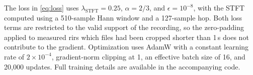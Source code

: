 \documentclass{article}
\begin{document}
The loss in \eqref{eq:loss} uses $\lambda_{\mathrm{STFT}}=0.25$, $\alpha=2/3$, and $\epsilon=10^{-8}$, with the STFT computed using a 510-sample Hann window and a 127-sample hop.
 Both loss terms are restricted to the valid support of the recording, so the zero-padding applied to measured \acp{rir} which files had been cropped shorter than 1\,s does not contribute to the gradient. 
Optimization uses AdamW \cite{loshchilov2019adamw} with a constant learning rate of $2\times10^{-4}$, gradient-norm clipping at 1, an effective batch size of 16, and 20,000 updates. 
Full training details are available in the accompanying code.
\end{document}
